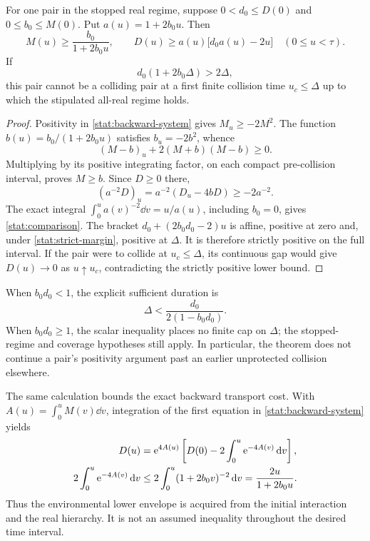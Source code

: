 \begin{theorem}
\label{stat:backward-comparison}
For one pair in the stopped real regime, suppose
$0<d_0\le D(0)$ and $0\le b_0\le M(0)$. Put
$a(u)=1+2b_0u$. Then
\begin{equation}
 M(u)\ge\frac{b_0}{1+2b_0u},\qquad
 \boxed{D(u)\ge a(u)\bigl[d_0a(u)-2u\bigr]}
 \quad(0\le u<\tau).
 \label{stat:comparison}
\end{equation}
If
\begin{equation}
 d_0(1+2b_0\Delta)>2\Delta,
 \label{stat:strict-margin}
\end{equation}
this pair cannot be a colliding pair at a first finite collision time
$u_c\le\Delta$ up to which the stipulated all-real regime holds.
\end{theorem}

\begin{proof}
Positivity in \eqref{stat:backward-system} gives $M_u\ge-2M^2$.
The function $b(u)=b_0/(1+2b_0u)$ satisfies $b_u=-2b^2$, whence
\[
 (M-b)_u+2(M+b)(M-b)\ge0.
\]
Multiplying by its positive integrating factor, on each compact
pre-collision interval, proves $M\ge b$. Since $D\ge0$ there,
\[
 (a^{-2}D)_u=a^{-2}(D_u-4bD)\ge-2a^{-2}.
\]
The exact integral $\int_0^u a(v)^{-2}\dd v=u/a(u)$, including $b_0=0$,
gives \eqref{stat:comparison}. The bracket
$d_0+(2b_0d_0-2)u$ is affine, positive at zero and, under
\eqref{stat:strict-margin}, positive at $\Delta$. It is therefore
strictly positive on the full interval. If the pair were to collide
at $u_c\le\Delta$, its continuous gap would give $D(u)\to0$ as
$u\uparrow u_c$, contradicting the strictly positive lower bound.
\end{proof}

When $b_0d_0<1$, the explicit sufficient duration is
\begin{equation}
 \Delta<\frac{d_0}{2(1-b_0d_0)}.
 \label{stat:duration}
\end{equation}
When $b_0d_0\ge1$, the scalar inequality places no finite cap on
$\Delta$; the stopped-regime and coverage hypotheses still apply.
In particular, the theorem does not continue a pair's positivity
argument past an earlier unprotected collision elsewhere.

The same calculation bounds the exact backward transport cost. With
$A(u)=\int_0^u M(v)\dd v$, integration of the first equation in
\eqref{stat:backward-system} yields
\begin{equation}
 \begin{split}
 D(u)&=\mathrm e^{4A(u)}
       \left[D(0)-2\int_0^u\mathrm e^{-4A(v)}\,\mathrm d v\right],\\
 2\int_0^u\mathrm e^{-4A(v)}\,\mathrm d v
     &\le2\int_0^u(1+2b_0v)^{-2}\,\mathrm d v
       =\frac{2u}{1+2b_0u}.
 \end{split}
 \label{stat:cost}
\end{equation}
Thus the environmental lower envelope is acquired from the initial
interaction and the real hierarchy. It is not an assumed inequality
throughout the desired time interval.

